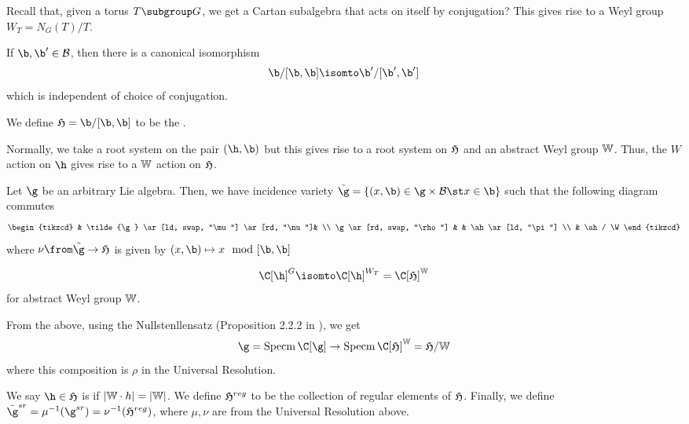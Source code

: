 Recall that, given a torus \(T \subgroup G\), we get a Cartan
subalgebra that acts on itself by conjugation? This gives rise to a
Weyl group \(W_T = N_G(T)/T\). 
\begin{lem}
  If \(\b,\b' \in \cB\), then there is a canonical isomorphism \[
    \b/[\b,\b] \isomto \b'/[\b',\b']
  \]
  which is independent of choice of conjugation.
\end{lem}
\begin{defn}
  We define \(\ah = \b/[\b,\b]\) to be the .
\end{defn}
\begin{prop}
  Normally, we take a root system on the pair \((\h,\b)\) but this
  gives rise to a root system on \(\mathfrak{H}\) and an abstract Weyl group
  \(\mathbb{W}\). Thus, the \(W\) action on \(\h\) gives rise to a \(\mathbb{W}\)
  action on \(\mathfrak{H}\). 
\end{prop}
\begin{thm}\label{univ-res}
  Let \(\g\) be an arbitrary Lie algebra. Then, we have incidence
  variety \(\tilde{\g} = \{(x,\b) \in \g \times \cB \st x \in \b\}\)
  such that the following diagram commutes \[
    \begin{tikzcd}
      & \tilde{\g} \ar[ld, swap, "\mu"] \ar[rd, "\nu"]& \\
      \g \ar[rd, swap, "\rho"] & & \ah \ar[ld, "\pi"] \\
      & \ah / \W
    \end{tikzcd}
  \]
  where \(\nu \from \tilde{\g} \to \ah\) is given by \((x,\b) \mapsto x
  \mod [\b,\b]\)
\end{thm}
\begin{thm}
   \[
    \C[\h]^G \isomto \C[\h]^{W_T} = \C[\ah]^{\W}
  \]
  for abstract Weyl group \(\mathbb{W}\). 
\end{thm}
\begin{cor}
  From the above, using the Nullstenllensatz (Proposition 2.2.2 in \cite{cg}), we get \[
    \g = \operatorname{Specm} \C[\g] \to \operatorname{Specm}
    \C[\ah]^\W = \ah/\W
  \]
  where this composition is \(\rho\) in the Universal
  Resolution. 
\end{cor}
\begin{defn}
  We say \(\h \in \ah\) is  if \(|\mathbb{W} \cdot h| = |\mathbb{W}|\). We
  define \(\mathfrak{H}^{reg}\) to be the collection of regular elements of
  \(\mathfrak{H}\). Finally, we define \(\tilde{\g}^{sr} = \mu^{-1}(\g^{sr}) =
  \nu^{-1}(\ah^{reg})\), where \(\mu,\nu\) are from the Universal
  Resolution above.
\end{defn}
